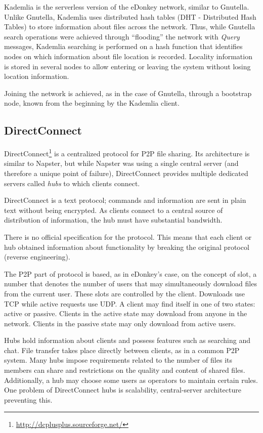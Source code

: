 Kademlia is the serverless version of the eDonkey network, similar to
Gnutella.  Unlike Gnutella, Kademlia uses distributed hash tables (DHT -
Distributed Hash Tables) to store information about files across the network.
Thus, while Gnutella search operations were achieved through ``flooding'' the
network with \textit{Query} messages, Kademlia searching is performed on a
hash function that identifies nodes on which information about file location
is recorded. Locality information is stored in several nodes to
allow entering or leaving the system without losing location information.

Joining the network is achieved, as in the case of Gnutella, through a bootstrap
node, known from the beginning by the Kademlia client.

\subsection{DirectConnect}

DirectConnect\footnote{\url{http://dcplusplus.sourceforge.net/}} is a centralized protocol for P2P file sharing. Its architecture
is similar to Napster, but while Napster was using a single central server
(and therefore a unique point of failure), DirectConnect provides multiple
dedicated servers called \textit{hubs} to which clients connect.

DirectConnect is a text protocol; commands and information are sent in plain
text
without being encrypted. As clients connect to a central source of
distribution of information, the hub must have substantial bandwidth.

There is no official specification for the protocol. This means that each
client or hub obtained information about functionality by breaking the
original protocol (reverse engineering).

The P2P part of protocol is based, as in eDonkey's case, on the concept of
slot, a number that denotes the number of users that may simultaneously
download files from the current user. These slots are controlled by the
client. Downloads use TCP while active requests use UDP. A client may find
itself in one of two states: active or passive. Clients in the active state may
download from anyone in the network. Clients in the passive state may
only download from active users.

Hubs hold information about clients and possess features such as searching and
chat. File transfer takes place directly between clients, as in a common P2P
system. Many hubs impose requirements related to the number of files its
members can share and restrictions on the quality and content of shared
files. Additionally, a hub may choose some users as operators to maintain
certain rules. One problem of DirectConnect hubs is scalability,
central-server architecture preventing this.

